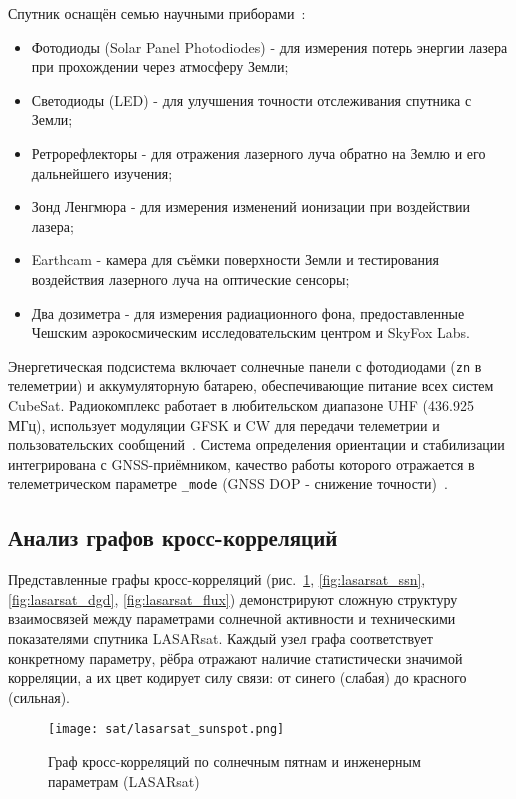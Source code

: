 Спутник оснащён семью научными приборами~\cite{wiki_lasarsat, lasar_info}:
\begin{itemize}[wide]
	\item Фотодиоды (Solar Panel Photodiodes) - для измерения потерь энергии лазера при прохождении через атмосферу Земли;
	\item Светодиоды (LED) - для улучшения точности отслеживания спутника с Земли;
	\item Ретрорефлекторы - для отражения лазерного луча обратно на Землю и его дальнейшего изучения;
	\item Зонд Ленгмюра - для измерения изменений ионизации при воздействии лазера;
	\item Earthcam - камера для съёмки поверхности Земли и тестирования воздействия лазерного луча на оптические сенсоры;
	\item Два дозиметра - для измерения радиационного фона, предоставленные Чешским аэрокосмическим исследовательским центром и SkyFox Labs.
\end{itemize}

Энергетическая подсистема включает солнечные панели с фотодиодами (\texttt{zn} в
телеметрии) и аккумуляторную батарею, обеспечивающие питание всех систем
CubeSat. Радиокомплекс работает в любительском диапазоне UHF (436.925 МГц),
использует модуляции GFSK и CW для передачи телеметрии и пользовательских
сообщений~\cite{satnogs_lasarsat, spacemanic_lasarsat}. Система определения
ориентации и стабилизации интегрирована с GNSS-приёмником, качество работы
которого отражается в телеметрическом параметре \texttt{\_mode} (GNSS DOP -
снижение точности)~\cite{spacemanic_lasarsat, satnogs_lasarsat}.

\subsection{Анализ графов кросс-корреляций}

Представленные графы кросс-корреляций
(рис.~\ref{fig:lasarsat_sunspot},
\ref{fig:lasarsat_ssn},
\ref{fig:lasarsat_dgd},
\ref{fig:lasarsat_flux})
демонстрируют сложную структуру взаимосвязей между параметрами солнечной
активности и техническими показателями спутника LASARsat. Каждый узел графа
соответствует конкретному параметру, рёбра отражают наличие статистически
значимой корреляции, а их цвет кодирует силу связи: от синего (слабая) до
красного (сильная).

\begin{figure}[H]
	\centering
	\texttt{[image: sat/lasarsat\_sunspot.png]}
	\caption{Граф кросс-корреляций по солнечным пятнам и инженерным параметрам (LASARsat)}
	\label{fig:lasarsat_sunspot}
\end{figure}

